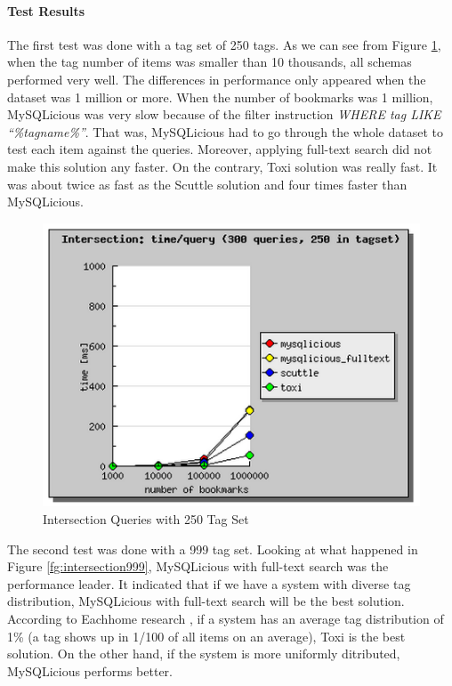 \paragraph{Test Results}

The first test was done with a tag set of 250 tags. As we can see from Figure \ref{fg:intersection250}, when  the tag number of items was smaller than 10 thousands, all schemas performed very well. The differences in performance only appeared when the dataset was 1 million or more. When the number of bookmarks was 1 million, MySQLicious was very slow because of the filter instruction \textit{WHERE tag LIKE ``\%tagname\%''}. That was, MySQLicious had to go through the whole dataset to test each item against the queries. Moreover, applying full-text search did not make this solution any faster. On the contrary, Toxi solution was really fast. It was about twice as fast as the Scuttle solution and four times faster than MySQLicious.

\begin{figure}[!h]
\begin{centering}
\includegraphics[scale=0.8]{pics/intersection250}
\caption{Intersection Queries with 250 Tag Set}\label{fg:intersection250}
\end{centering}
\end{figure}

The second test was done with a 999 tag set. Looking at what happened in Figure \ref{fg:intersection999}, MySQLicious with full-text search was the performance leader. It indicated that if we have a system with diverse tag distribution, MySQLicious with full-text search will be the best solution. According to Eachhome research \cite{puiperformance}, if a system has an average tag distribution of 1\% (a tag shows up in 1/100 of all items on an average), Toxi is the best solution. On the other hand, if the system is more uniformly ditributed, MySQLicious performs better.

